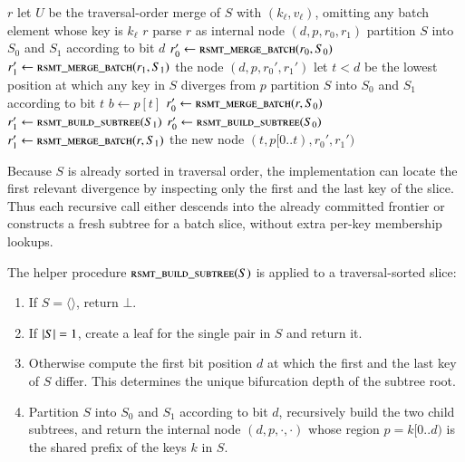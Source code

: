 \begin{algorithmic}
			\State \Return $r$
		\EndIf
			\State \Return {}
		\EndIf
			\State let $U$ be the traversal-order merge of $S$ with $(k_\ell, v_\ell)$, omitting any batch element whose key is $k_\ell$
				\State \Return $r$
			\EndIf
			\State \Return {}
		\EndIf
		\State parse $r$ as internal node $(d, p, r_0, r_1)$
		\If{$k[0..d) = p$ for every key $k$ in $S$}
			\State partition $S$ into $S_0$ and $S_1$ according to bit $d$
			\State $r_0' \gets \Call{rsmt\_merge\_batch}{r_0, S_0}$
			\State $r_1' \gets \Call{rsmt\_merge\_batch}{r_1, S_1}$
			\State \Return the node $(d, p, r_0', r_1')$
		\Else
			\State let $t < d$ be the lowest position at which any key in $S$ diverges from $p$
			\State partition $S$ into $S_0$ and $S_1$ according to bit $t$
			\State $b \gets p[t]$ 
				\State $r_0' \gets \Call{rsmt\_merge\_batch}{r, S_0}$
				\State $r_1' \gets \Call{rsmt\_build\_subtree}{S_1}$
			\Else
				\State $r_0' \gets \Call{rsmt\_build\_subtree}{S_0}$
				\State $r_1' \gets \Call{rsmt\_merge\_batch}{r, S_1}$
			\EndIf
			\State \Return the new node $(t, p[0..t), r_0', r_1')$ 
		\EndIf
	\EndFunction
\end{algorithmic}

Because $S$ is already sorted in traversal order, the implementation can locate the first relevant divergence by inspecting only the first and the last key of the slice. Thus each recursive call either descends into the already committed frontier or constructs a fresh subtree for a batch slice, without extra per-key membership lookups.

The helper procedure $\textsc{rsmt\_build\_subtree}(S)$ is applied to a traversal-sorted slice:

\begin{enumerate}
	\item If $S = \langle \rangle$, return $\bot$.
	\item If $\left|S\right| = 1$, create a leaf for the single pair in $S$ and return it.
	\item Otherwise compute the first bit position $d$ at which the first and the last key of $S$ differ. This determines the unique bifurcation depth of the subtree root.
	\item Partition $S$ into $S_0$ and $S_1$ according to bit $d$, recursively build the two child subtrees, and return the internal node $(d, p, \cdot, \cdot)$ whose region $p = k[0..d)$ is the shared prefix of the keys $k$ in $S$.
\end{enumerate}

